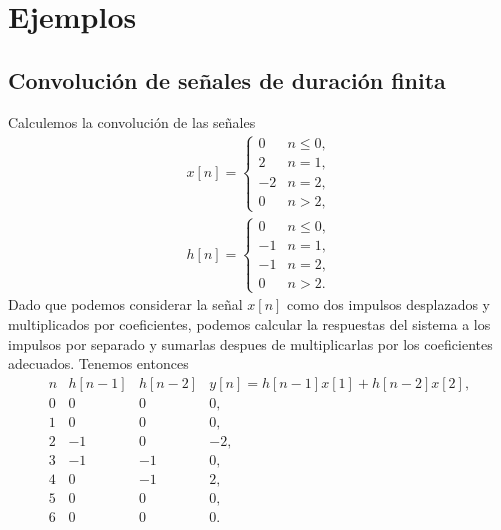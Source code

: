 \section{Ejemplos}

\subsection{Convoluci\'{o}n de se\~{n}ales de duraci\'{o}n finita}

Calculemos la convoluci\'{o}n de las se\~{n}ales
\begin{eqnarray}
  x\left[ n\right] =\left\{ \begin{array}{cc}
      0 & n\leq 0, \\ 
      2 & n=1, \\ 
      -2 & n=2, \\ 
      0 & n>2,
    \end{array}
  \right.                                        \\ 
  h\left[ n\right] =\left\{ \begin{array}{cc}
      0 & n\leq 0, \\ 
      -1 & n=1, \\ 
      -1 & n=2, \\ 
      0 & n>2.
    \end{array}
  \right.
\end{eqnarray}
Dado que podemos considerar la se\~{n}al $x[n]$ como dos impulsos
desplazados y multiplicados por coeficientes, podemos calcular la
respuestas del sistema a los impulsos por separado y sumarlas despues
de multiplicarlas por los coeficientes adecuados. Tenemos entonces
\begin{equation}
  \begin{array}{lllll}
    n &  h[n-1]   &       h[n-2]          &       y[n] = h[n-1] x[1] + h[n-2] x[2],        \\
    0 &  0        &       0               &       0,                                       \\
    1 &  0        &       0               &       0,                                       \\
    2 &  -1       &       0               &       -2,                                      \\
    3 &  -1       &       -1              &       0,                                       \\
    4 &  0        &       -1              &       2,                                       \\
    5 &  0        &       0               &       0,                                       \\
    6 &  0        &       0               &       0.               
  \end{array}
\end{equation}
